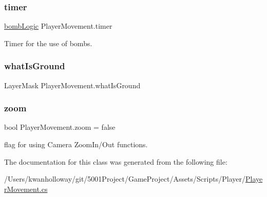\mbox{\label{class_player_movement_a5ea646039fd085e5c19acef918f24a21}} 
\subsubsection{\texorpdfstring{timer}{timer}}
{\footnotesize\ttfamily \hyperlink{classbomb_logic}{bomb\+Logic} Player\+Movement.\+timer}



Timer for the use of bombs. 

\mbox{\label{class_player_movement_a04b4dc5a83828e9fefcfe8acbf5de276}} 
\subsubsection{\texorpdfstring{what\+Is\+Ground}{whatIsGround}}
{\footnotesize\ttfamily Layer\+Mask Player\+Movement.\+what\+Is\+Ground}

\mbox{\label{class_player_movement_ae0fb74ddab994fb7627c7561629a8982}} 
\subsubsection{\texorpdfstring{zoom}{zoom}}
{\footnotesize\ttfamily bool Player\+Movement.\+zoom = false}



flag for using Camera Zoom\+In/\+Out functions. 



The documentation for this class was generated from the following file\+:\begin{DoxyCompactItemize}
\item 
/\+Users/kwanholloway/git/5001\+Project/\+Game\+Project/\+Assets/\+Scripts/\+Player/\hyperlink{_player_movement_8cs}{Player\+Movement.\+cs}\end{DoxyCompactItemize}
